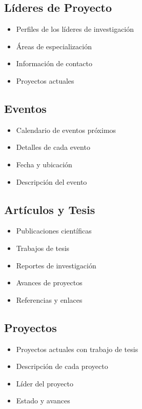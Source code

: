 \documentclass[12pt,letterpaper]{report}
\begin{document}
\subsection{Líderes de Proyecto}
\begin{itemize}
    \item Perfiles de los líderes de investigación
    \item Áreas de especialización
    \item Información de contacto
    \item Proyectos actuales
\end{itemize}

\subsection{Eventos}
\begin{itemize}
    \item Calendario de eventos próximos
    \item Detalles de cada evento
    \item Fecha y ubicación
    \item Descripción del evento
\end{itemize}

\subsection{Artículos y Tesis}
\begin{itemize}
    \item Publicaciones científicas
    \item Trabajos de tesis
    \item Reportes de investigación
    \item Avances de proyectos
    \item Referencias y enlaces
\end{itemize}

\subsection{Proyectos}
\begin{itemize}
    \item Proyectos actuales con trabajo de tesis
    \item Descripción de cada proyecto
    \item Líder del proyecto
    \item Estado y avances
\end{itemize}
\end{document}
